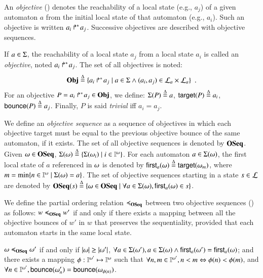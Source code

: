 An \emph{objective} () denotes the reachability of a local state (e.g., $a_j$) of a given automaton $a$
from the initial local state of that automaton (e.g., $a_i$).
Such an objective is written $\mbox{${a}_{i}\Rsh^*\!{a}_{j}$}$.
Successive objectives are described with objective sequences.

\begin{definition}
\label{def:obj}
  If $a \in \Sigma$, the reachability of a local state $a_j$ from a local state $a_i$ is called an \emph{objective}, noted $\mbox{$a_i\Rsh^*\!a_j$}$.
  The set of all objectives is noted:
  \[\mathbf{Obj} \stackrel{\Delta}= \{ \mbox{$a_i\Rsh^*\!a_j$} \mid a \in \Sigma \wedge (a_i, a_j) \in \mathcal{L}_a \times \mathcal{L}_a \} \enspace.\]
  For an objective $P = \mbox{$a_i\Rsh^*\!a_j$} \in \mathbf{Obj}$, we define: $\Sigma(P) \stackrel{\Delta}=
  a$, $\mathsf{target}(P)\stackrel{\Delta}= a_i$, $\mathsf{bounce}(P)\stackrel{\Delta}= a_j$.
  Finally, $P$ is said \emph{trivial} iff $a_i = a_j$.

  We define an \emph{objective sequence} as a sequence of objectives in which each objective target must be equal to the previous objective bounce of the same automaton, if it exists.
  The set of all objective sequences is denoted by $\mathbf{OSeq}$.
  Given $\omega\in\mathbf{OSeq}$, $\Sigma(\omega) \stackrel{\Delta}= \{\Sigma(\omega_i)\mid i\in\mathbb{I}^{\omega}\}$.
For each automaton $a\in\Sigma(\omega)$,  the first local state of $a$ referenced in
$\omega$ is denoted by $\mathsf{first}_a(\omega) \stackrel{\Delta}= \mathsf{target}(\omega_m)$, where $m=\min\{n\in\mathbb{I}^{\omega}\mid \Sigma(\omega)=a\}$.
  The set of objective sequences starting in a state $s\in\mathcal{L}$ are denoted by
  $\mathbf{OSeq}(s)\stackrel{\Delta}= \{\omega\in\mathbf{OSeq}\mid\forall a\in\Sigma(\omega), \mathsf{first}_a(\omega)\in s\}$.
\end{definition}


We define the partial ordering relation $\preccurlyeq_{\mathbf{OSeq}}$ between two objective sequences () as
follows:
$w\preccurlyeq_{\mathbf{OSeq}} w'$ if and only if there exists a mapping between all the objective bounces of $w'$ in $w$
that preserves the sequentiality, provided that each automaton starts in the same
local state.

\begin{definition}[$\ltw \subset \OS\times\OS$]\label{def:ltw}
$\omega\preccurlyeq_{\mathbf{OSeq}}\omega'$ if and only if
$|\omega|\geq|\omega'|$,
$\forall a\in\Sigma(\omega'), a\in\Sigma(\omega) \wedge \mathsf{first}_a(\omega')=\mathsf{first}_a(\omega)$;
and there exists a mapping $\phi: \mathbb{I}^{\omega'}\mapsto \mathbb{I}^{\omega}$ such that
$\forall n,m \in\mathbb{I}^{\omega'}, n<m \Leftrightarrow \phi(n)<\phi(m)$,
and
$\forall n\in\mathbb{I}^{\omega'}, \mathsf{bounce}(\omega'_n)=\mathsf{bounce}(\omega_{\phi(n)})$.
\end{definition}

